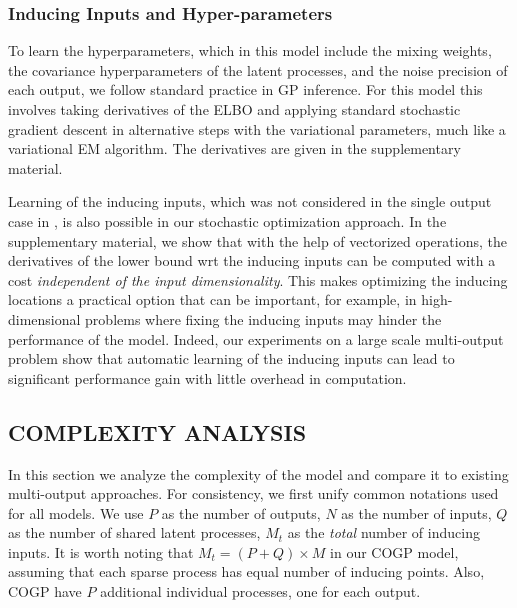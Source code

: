 \subsubsection{Inducing Inputs and Hyper-parameters \label{sec:hyperparameters}}
To learn the hyperparameters, which in this model include the mixing weights, the covariance hyperparameters of the latent processes, and the noise precision of each output, we follow standard practice in GP inference.
For this model this involves taking derivatives of the ELBO and applying standard stochastic gradient descent in alternative steps with the variational parameters, much like a variational EM algorithm. 
The derivatives are given in the supplementary material.

Learning of the inducing inputs, which was not considered in the single output case in \citet{hensmangaussian}, is also possible in our stochastic optimization approach.
In the supplementary material, we show that with the help of vectorized operations, the derivatives of the lower bound wrt the inducing inputs can be computed with a cost \emph{independent of the input dimensionality}.
This makes optimizing the inducing locations a practical option that can be important, for example, in high-dimensional problems where fixing the inducing inputs may hinder the performance of the model.
Indeed, our experiments on a large scale multi-output problem show that automatic learning of the inducing inputs can lead to significant performance gain with little overhead in computation. 
%
\subsection{COMPLEXITY ANALYSIS}
In this section we analyze the complexity of the model and compare it to existing multi-output approaches.
For consistency, we first unify common notations used for all models.
We use $P$ as the number of outputs, $N$ as the number of inputs, $Q$ as the number of shared latent processes, $M_t$ as the \emph{total} number of inducing inputs.
It is worth noting that $M_t = (P + Q) \times M$ in our COGP model, assuming that each sparse process has equal number of inducing points. 
Also, COGP have $P$ additional individual processes, one for each output.

